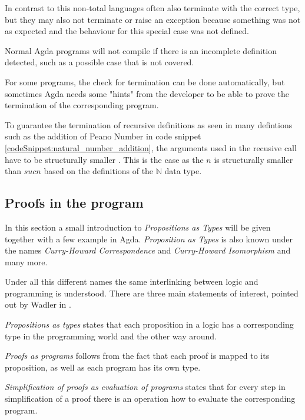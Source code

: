 In contrast to this non-total languages often also terminate with the correct type, but they may also not terminate or raise an exception because something was not as expected and the behaviour for this special case was not defined.

Normal Agda programs will not compile if there is an incomplete definition detected, such as a possible case that is not covered.

For some programs, the check for termination can be done automatically, but sometimes Agda needs some "hints" from the developer to be able to prove the termination of the corresponding program.

To guarantee the termination of recursive definitions as seen in many defintions such as the addition of Peano Number in code snippet \ref{codeSnippet:natural_number_addition}, 
the arguments used in the recusive call have to be structurally smaller \cite{norell:deptyped}. 
This is the case as the $n$ is structurally smaller than $suc n$ based on the definitions of the $\mathbb{N}$ data type.

\subsection{Proofs in the program}\label{section:agda_proofs}
In this section a small introduction to \emph{Propositions as Types}\cite{10.1145/2699407} will be given together with a few example in Agda. \emph{Proposition as Types} is also known under the names \emph{Curry-Howard Correspondence}\cite{10.5555/1076265} and \emph{Curry-Howard Isomorphism}\cite{10.1145/2841316} and many more.

Under all this different names the same interlinking between logic and programming is understood. There are three main statements of interest, pointed out by Wadler in \cite{10.1145/2699407}.

\emph{Propositions as types} states that each proposition in a logic has a corresponding type in the programming world and the other way around. 

\emph{Proofs as programs} follows from the fact that each proof is mapped to its proposition, as well as each program has its own type.

\emph{Simplification of proofs as evaluation of programs} states that for every step in simplification of a proof there is an operation how to evaluate the corresponding program.

